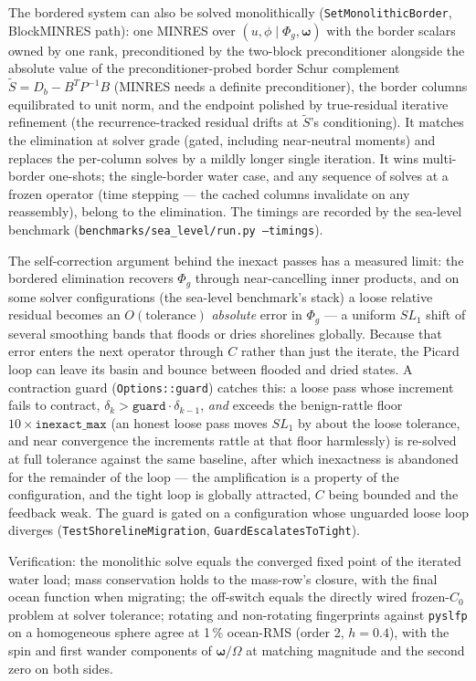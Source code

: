 \documentclass[11pt]{article}
\numberwithin{equation}{section}
\theoremstyle{remark}
\newcommand{\code}[1]{\texttt{#1}}
\begin{document}
The bordered system can also be solved monolithically
(\code{SetMonolithicBorder}, BlockMINRES path): one MINRES over
$(u, \phi \mid \Phi_g, \bm\omega)$ with the border scalars owned by
one rank, preconditioned by the two-block preconditioner alongside the
absolute value of the preconditioner-probed border Schur complement
$\tilde S = D_b - B^T P^{-1} B$ (MINRES needs a definite
preconditioner), the border columns equilibrated to unit norm, and the
endpoint polished by true-residual iterative refinement (the
recurrence-tracked residual drifts at $\tilde S$'s conditioning). It
matches the elimination at solver grade (gated, including near-neutral
moments) and replaces the per-column solves by a mildly longer single
iteration. It wins multi-border one-shots; the single-border water
case, and any sequence of solves at a frozen operator (time stepping
--- the cached columns invalidate on any reassembly), belong to the
elimination. The timings are recorded by the sea-level benchmark
(\code{benchmarks/sea\_level/run.py --timings}).

The self-correction argument behind the inexact passes has a measured
limit: the bordered elimination recovers $\Phi_g$ through
near-cancelling inner products, and on some solver configurations (the
sea-level benchmark's stack) a loose relative residual becomes an
$O(\text{tolerance})$ \emph{absolute} error in $\Phi_g$ --- a uniform
$SL_1$ shift of several smoothing bands that floods or dries shorelines
globally. Because that error enters the next operator through $C$
rather than just the iterate, the Picard loop can leave its basin and
bounce between flooded and dried states. A contraction guard
(\code{Options::guard}) catches this: a loose pass whose increment
fails to contract, $\delta_k > \code{guard}\cdot\delta_{k-1}$,
\emph{and} exceeds the benign-rattle floor $10\times\code{inexact\_max}$
(an honest loose pass moves $SL_1$ by about the loose tolerance, and
near convergence the increments rattle at that floor harmlessly) is
re-solved at full tolerance against the same baseline, after which
inexactness is abandoned for the remainder of the loop --- the
amplification is a property of the configuration, and the tight loop is
globally attracted, $C$ being bounded and the feedback weak. The guard
is gated on a configuration whose unguarded loose loop diverges
(\code{TestShorelineMigration}, \code{GuardEscalatesToTight}).

Verification: the monolithic solve equals the converged fixed point of
the iterated water load; mass conservation holds to the mass-row's
closure, with the final ocean function when migrating; the off-switch
equals the directly wired frozen-$C_0$ problem at solver tolerance;
rotating and non-rotating fingerprints against \code{pyslfp} on a
homogeneous sphere agree at 1\,\% ocean-RMS (order 2, $h = 0.4$), with
the spin and first wander components of $\bm\omega/\Omega$ at matching
magnitude and the second zero on both sides.
\end{document}
